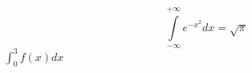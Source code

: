 
\cite{Knuth1984TheTeXbook}
\cite{Stolyarov2010SverstaiDiplom}
\cite{Habr2012TempDisser}
\cite{Habr2012BacDiplom}
\cite{Sjutkin2002Manual}
\cite{DSTU20153008}
\cite{Lvovskii2010NaborVerstka}
\cite{}
\cite{}
\cite{}

\begin{equation}
\label{eq:fourierrow}
\int\limits^{+\infty}_{-\infty} e^{-x^2} dx = \sqrt{\pi} 
\end{equation}
$\int_{0}^{3} f(x) dx $